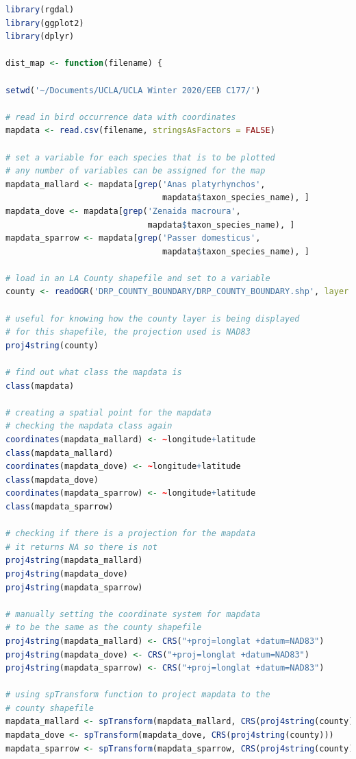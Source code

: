 \documentclass[letterpaper]{article}
\begin{document}
\begin{lstlisting}[language=R]
library(rgdal)
library(ggplot2)
library(dplyr)

dist_map <- function(filename) {
  
setwd('~/Documents/UCLA/UCLA Winter 2020/EEB C177/')
  
# read in bird occurrence data with coordinates
mapdata <- read.csv(filename, stringsAsFactors = FALSE)

# set a variable for each species that is to be plotted
# any number of variables can be assigned for the map
mapdata_mallard <- mapdata[grep('Anas platyrhynchos',
                                mapdata$taxon_species_name), ]
mapdata_dove <- mapdata[grep('Zenaida macroura',
                             mapdata$taxon_species_name), ]
mapdata_sparrow <- mapdata[grep('Passer domesticus',
                                mapdata$taxon_species_name), ]

# load in an LA County shapefile and set to a variable
county <- readOGR('DRP_COUNTY_BOUNDARY/DRP_COUNTY_BOUNDARY.shp', layer = 'DRP_COUNTY_BOUNDARY')

# useful for knowing how the county layer is being displayed
# for this shapefile, the projection used is NAD83
proj4string(county)

# find out what class the mapdata is
class(mapdata)

# creating a spatial point for the mapdata
# checking the mapdata class again
coordinates(mapdata_mallard) <- ~longitude+latitude
class(mapdata_mallard)
coordinates(mapdata_dove) <- ~longitude+latitude
class(mapdata_dove)
coordinates(mapdata_sparrow) <- ~longitude+latitude
class(mapdata_sparrow)

# checking if there is a projection for the mapdata
# it returns NA so there is not
proj4string(mapdata_mallard)
proj4string(mapdata_dove)
proj4string(mapdata_sparrow)
            
# manually setting the coordinate system for mapdata
# to be the same as the county shapefile
proj4string(mapdata_mallard) <- CRS("+proj=longlat +datum=NAD83")
proj4string(mapdata_dove) <- CRS("+proj=longlat +datum=NAD83")
proj4string(mapdata_sparrow) <- CRS("+proj=longlat +datum=NAD83")

# using spTransform function to project mapdata to the
# county shapefile
mapdata_mallard <- spTransform(mapdata_mallard, CRS(proj4string(county)))
mapdata_dove <- spTransform(mapdata_dove, CRS(proj4string(county)))
mapdata_sparrow <- spTransform(mapdata_sparrow, CRS(proj4string(county)))


\end{lstlisting}
\end{document}
